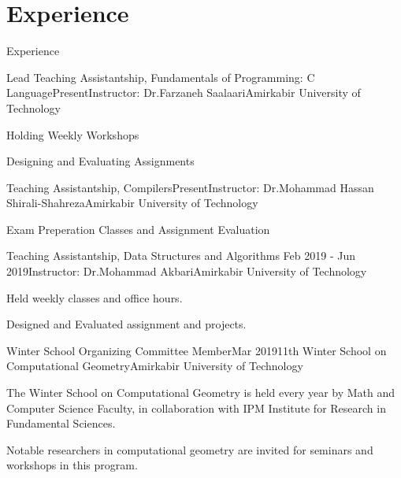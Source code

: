 \documentclass{resume} %
\begin{document}
	\section{Experience}
	\begin{rSection}{Experience}
		\begin{rSubsection}{Lead Teaching Assistantship, Fundamentals of Programming: C Language}{Present}{Instructor: Dr.Farzaneh Saalaari}{Amirkabir University of Technology}
		\item Holding Weekly Workshops
		\item Designing and Evaluating Assignments
		
		\end{rSubsection}					%
		\begin{rSubsection}{Teaching Assistantship, Compilers}{Present}{Instructor: Dr.Mohammad Hassan Shirali-Shahreza}{Amirkabir University of Technology}
		\item Exam Preperation Classes and Assignment Evaluation
		\end{rSubsection}					%
		\begin{rSubsection}{Teaching Assistantship, Data Structures and Algorithms }{Feb 2019 - Jun 2019}{Instructor: Dr.Mohammad Akbari}{Amirkabir University of Technology}
			\item 
			Held weekly classes and office hours.
			\item 
			Designed and Evaluated assignment and projects.
		\end{rSubsection}
		\begin{rSubsection}{Winter School Organizing Committee Member}{Mar 2019}{11th Winter School on Computational Geometry}{Amirkabir University of Technology}
			\item 	The Winter School on Computational Geometry is held every year by Math and Computer Science Faculty, in collaboration with IPM Institute for Research in Fundamental Sciences.
			\item Notable researchers in computational geometry are invited for seminars and workshops in this program.
		\end{rSubsection}
		
		
		

\end{rSection}
\end{document}

